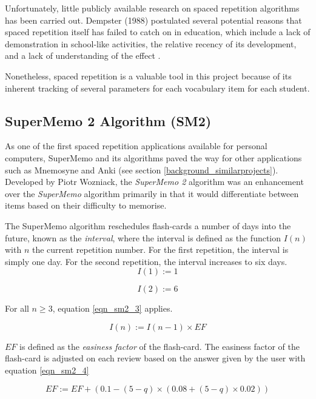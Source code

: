 Unfortunately, little publicly available research on spaced repetition
algorithms has been carried out. Dempster (1988)
postulated several potential reasons that spaced repetition itself has failed 
to catch on in education, which include a lack of demonstration in school-like activities, the
relative recency of its development, and a lack of understanding of the effect
\cite{dempster_spacing_effect_1988}.
 
Nonetheless, spaced repetition is a valuable tool in this project because of its
inherent tracking of several parameters for each vocabulary item for each student.

\subsection*{SuperMemo 2 Algorithm (SM2)}
As one of the first spaced repetition applications available for personal computers,
SuperMemo and its algorithms paved the way for other applications such as Mnemosyne and
Anki (see section \ref{background_similarprojects}). Developed by Piotr
Wozniack\cite{wozniak_optimization_1990}, the \textit{SuperMemo 2} algorithm was an
enhancement over the \textit{SuperMemo} algorithm primarily in that it would differentiate 
between items based on their difficulty to memorise\cite{wozniak_optimization_1990}.

The SuperMemo algorithm reschedules flash-cards a number of days into the future, known
as the \textit{interval}, where the interval is defined as the function $I(n)$ with $n$ the
current repetition number. For the first repetition, the interval is simply one day.
For the second repetition, the interval increases to six days. 
\begin{equation}
I(1) := 1
\end{equation}

\begin{equation}
I(2) := 6
\end{equation}

For all $n \geq 3$, equation \ref{eqn_sm2_3} applies.

\begin{equation}
\label{eqn_sm2_3}
I(n) := I(n-1) \times EF
\end{equation}

$EF$ is defined as the \textit{easiness factor} of the flash-card. The easiness factor
of the flash-card is adjusted on each review based on the answer given by the user with
equation \ref{eqn_sm2_4}

\begin{equation}
\label{eqn_sm2_4}
EF := EF + (0.1 - (5 - q) \times (0.08 + (5 - q) \times 0.02))
\end{equation}

